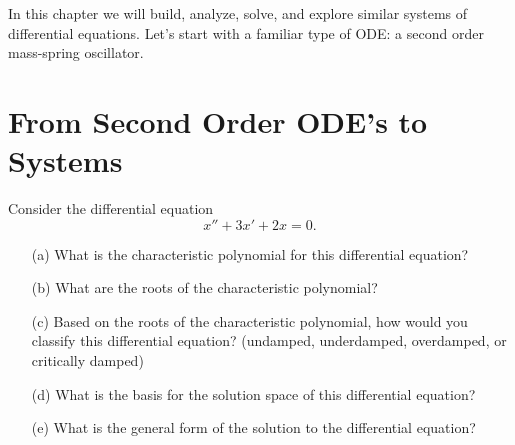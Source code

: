 In this chapter we will build, analyze, solve, and explore similar systems of
differential equations.  Let's start with a familiar type of ODE: a second order
mass-spring oscillator.


\section{From Second Order ODE's to Systems}  


\begin{problem}
    Consider the differential equation
    \[ x'' + 3x' + 2x = 0. \]
    \begin{enumerate}
        \item[(a)] What is the characteristic polynomial for this differential equation?
        \item[(b)] What are the roots of the characteristic polynomial?
        \item[(c)] Based on the roots of the characteristic polynomial, how would you
            classify this differential equation? (undamped, underdamped, overdamped, or
            critically damped)
        \item[(d)] What is the basis for the solution space of this differential equation?
        \item[(e)] What is the general form of the solution to the differential equation?
    \end{enumerate}
\end{problem}

